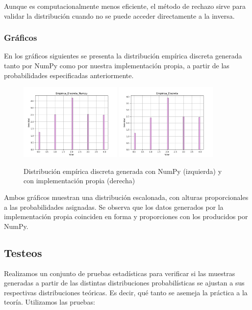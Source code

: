 \documentclass{article}
\begin{document}
Aunque es computacionalmente menos eficiente, el método de rechazo sirve para validar la distribución cuando no se puede acceder directamente a la inversa.

\subsubsection{Gráficos}
En los gráficos siguientes se presenta la distribución empírica discreta generada tanto por NumPy como por nuestra implementación propia, a partir de las probabilidades especificadas anteriormente.

\begin{figure}[H]
    \centering
    \includegraphics[width=0.45\textwidth]{Imagenes/Distribucion_Empirica_Discreta_Numpy.png}
    \includegraphics[width=0.45\textwidth]{Imagenes/Distribucion_Empirica_Discreta.png}
    \caption{Distribución empírica discreta generada con NumPy (izquierda) y con implementación propia (derecha)}
    \label{fig:empirica_discreta}
\end{figure}

Ambos gráficos muestran una distribución escalonada, con alturas proporcionales a las probabilidades asignadas. Se observa que los datos generados por la implementación propia coinciden en forma y proporciones con los producidos por NumPy.


\subsection{Testeos}
Realizamos un  conjunto de pruebas estadísticas para verificar si las muestras generadas a partir de las distintas distribuciones probabilísticas se ajustan a sus respectivas distribuciones teóricas. Es decir, qué tanto se asemeja la práctica a la teoría. Utilizamos las pruebas:
\end{document}
